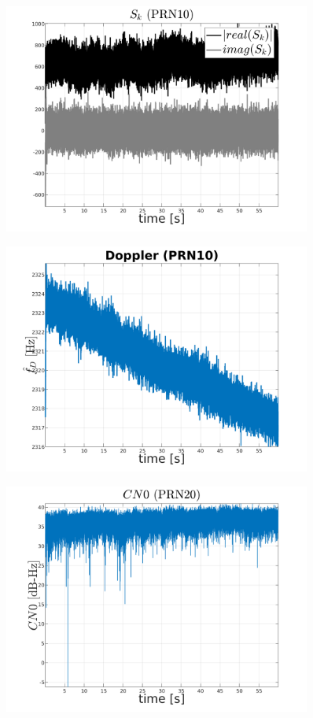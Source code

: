\begin{figure}[H]
	\centering
	\includegraphics[width=0.9\textwidth]{fig/sk_PRN10.png}
\end{figure}

\begin{figure}[H]
	\centering
	\includegraphics[width=0.9\textwidth]{fig/doppler_PRN10.png}
\end{figure}

\begin{figure}[H]
	\centering
	\includegraphics[width=0.9\textwidth]{fig/CN0_PRN20.png}
\end{figure}

